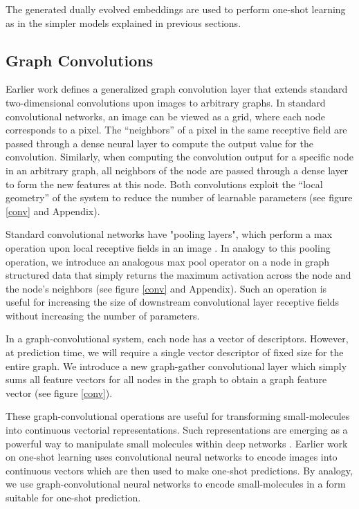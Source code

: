\documentclass[journal=jacsat,manuscript=article]{achemso}
\begin{document}
The generated dually evolved embeddings are used to perform one-shot learning as in the simpler models explained in previous sections.

\subsection{Graph Convolutions}
Earlier work \cite{duvenaud2015convolutional} defines a generalized graph convolution layer that extends standard two-dimensional convolutions upon images to arbitrary graphs. In standard convolutional networks, an image can be viewed as a grid, where each node corresponds to a pixel. The ``neighbors'' of a pixel in the same receptive field are passed through a dense neural layer to compute the output value for the convolution\cite{karpathy231n}. Similarly, when computing the convolution output for a specific node in an arbitrary graph, all neighbors of the node are passed through a dense layer to form the new features at this node. Both convolutions exploit the ``local geometry'' of the system to reduce the number of learnable parameters (see figure \ref{conv} and Appendix).

Standard convolutional networks have "pooling layers", which perform a max operation upon local receptive fields in an image \cite{karpathy231n}. In analogy to this pooling operation, we introduce an analogous max pool operator on a node in graph structured data that simply returns the maximum activation across the node and the node's neighbors (see figure \ref{conv} and Appendix). Such an operation is useful for increasing the size of downstream convolutional layer receptive fields without increasing the number of parameters.

In a graph-convolutional system, each node has a vector of descriptors. However, at prediction time, we will require a single vector descriptor of fixed size for the entire graph. We introduce a new graph-gather convolutional layer which simply sums all feature vectors for all nodes in the graph to obtain a graph feature vector (see figure \ref{conv}).

These graph-convolutional operations are useful for transforming small-molecules into continuous vectorial representations. Such representations are emerging as a powerful way to manipulate small molecules within deep networks \cite{gomez2016automatic}. Earlier work on one-shot learning uses convolutional neural networks to encode images into continuous vectors which are then used to make one-shot predictions. By analogy, we use graph-convolutional neural networks to encode small-molecules in a form suitable for one-shot prediction.
\end{document}
